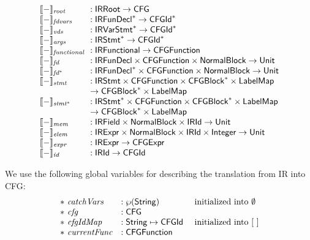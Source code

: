 \[
\begin{array}{l@{~~}l}
\transfun{-}_{\emph{root}} &: \IRRoot \rightarrow \CFG \\
\transfun{-}_{\emph{fdvars}} &: \IRFunDecl^{*} \rightarrow \CFGId^{*} \\
\transfun{-}_{\emph{vds}} &: \IRVarStmt^{*} \rightarrow \CFGId^{*} \\
\transfun{-}_{\emph{args}} &: \IRStmt^{*} \rightarrow \CFGId^{*} \\
\transfun{-}_{\emph{functional}} &: \IRFunctional \rightarrow \CFGFunction \\
\transfun{-}_{\emph{fd}} &: \IRFunDecl \times \CFGFunction \times \NormalBlock \rightarrow \Unit \\
\transfun{-}_{\emph{fd}^{*}} &: \IRFunDecl^{*} \times \CFGFunction \times \NormalBlock \rightarrow \Unit \\
\transfun{-}_{\emph{stmt}} &: \IRStmt \times \CFGFunction \times \CFGBlock^{*} \times \LabelMap\\
& \rightarrow \CFGBlock^{*} \times \LabelMap\\
\transfun{-}_{\emph{stmt}^{*}} &: \IRStmt^{*} \times \CFGFunction \times \CFGBlock^{*} \times \LabelMap\\
& \rightarrow \CFGBlock^{*} \times \LabelMap\\
\transfun{-}_{\emph{mem}} &: \IRField \times \NormalBlock \times \IRId \rightarrow \Unit \\
\transfun{-}_{\emph{elem}} &: \IRExpr \times \NormalBlock \times \IRId \times \Integer \rightarrow \Unit \\
\transfun{-}_{\emph{expr}} &: \IRExpr \rightarrow \CFGExpr \\
\transfun{-}_{\emph{id}} &: \IRId \rightarrow \CFGId \\
\end{array}
\]

We use the following global variables for describing the translation from IR into CFG:
\[
\begin{array}{lll}
*\ \emph{catchVars} &: \wp(\mbox{\textsf{String}}) & \text{ initialized into } \emptyset\\
*\ \emph{cfg} &: \mbox{\textsf{CFG}} &\\
*\ \emph{cfgIdMap} &: \mbox{\textsf{String}} \mapsto \mbox{\textsf{CFGId}} & \text{ initialized into } [\ ]\\
*\ \emph{currentFunc} &: \mbox{\textsf{CFGFunction}} & \\
\end{array}
\]

